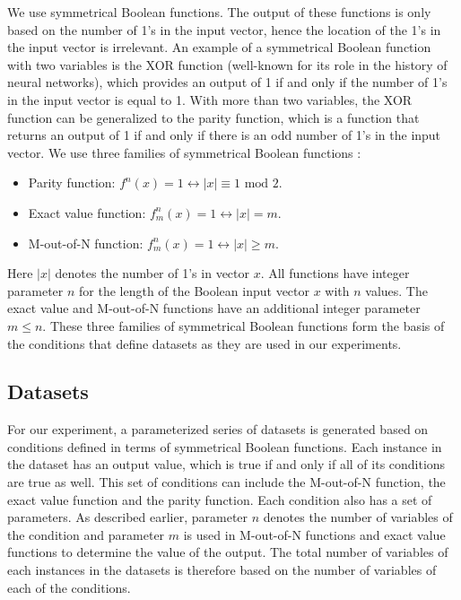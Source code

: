 \documentclass[letterpaper]{article} %
\begin{document}
We use %
symmetrical Boolean functions. The output of these functions is only based on the number of 1's in the input vector, hence the location of the 1's in the input vector is irrelevant. An example of a symmetrical Boolean function with two variables is the XOR function (well-known for its role in the history of neural networks), which provides an output of 1 if and only if the number of 1's in the input vector is equal to 1. With more than two variables, the XOR function can be generalized to the parity function, which is a function that returns an output of 1 if and only if there is an odd number of 1's in the input vector. We use three families of symmetrical Boolean functions \cite{wegener1987complexity}:

\begin{itemize}
\item
Parity function:  $f^n(x) = 1 \leftrightarrow |x| \equiv 1 \text{ mod } 2$. 
\item
Exact value function:  $f^n_m(x) = 1 \leftrightarrow |x|= m$.
\item
M-out-of-N function: $f^n_m(x) = 1 \leftrightarrow |x| \geq m$. 
\end{itemize}

\noindent Here $|x|$ denotes the number of 1's in vector $x$. All functions have integer parameter $n$ for the length of the Boolean input vector $x$ with $n$ values. The exact value and M-out-of-N functions have an additional integer parameter $m \leq n$. These three families of symmetrical Boolean functions form the basis of the conditions that define datasets as they are used in our experiments. 

\subsection{Datasets}
For our experiment, a parameterized series of datasets is generated based on conditions defined in terms of symmetrical Boolean functions. Each instance in the dataset has an output value, which is true if and only if all of its conditions are true as well. This set of conditions can include the M-out-of-N function, the exact value function and the parity function. Each condition also has a set of parameters. As described earlier, parameter $n$ denotes the number of variables of the condition and parameter $m$ is used in M-out-of-N functions and exact value functions to determine the value of the output. The total number of variables of each instances in the datasets is therefore based on the number of variables of each of the conditions.
\end{document}
